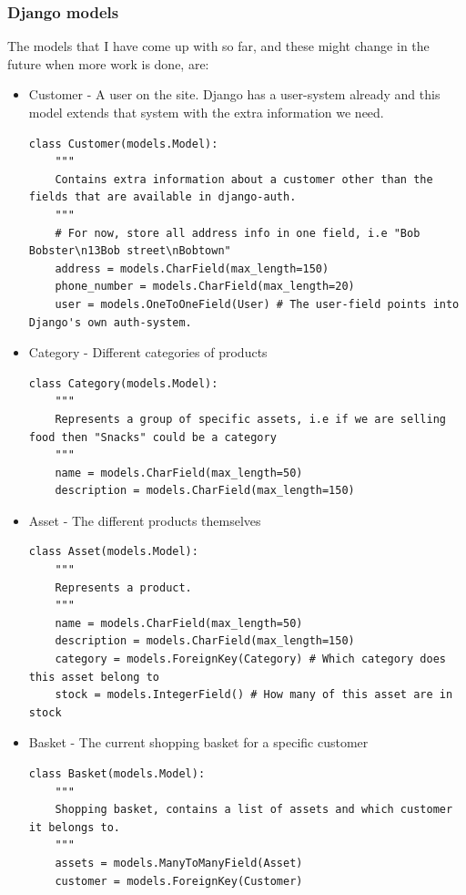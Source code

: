 \documentclass[12pt, a4paper,titlepage]{article}
\begin{document}
\subsubsection{Django models}
\label{sec:djangomodels}
The models that I have come up with so far, and these might change in the
future when more work is done, are:

\begin{itemize}
\setlength\itemsep{-1pt}
\item Customer - A user on the site. Django has a user-system already and this
model extends that system with the extra information we need.
\begin{lstlisting}
class Customer(models.Model):
    """ 
    Contains extra information about a customer other than the fields that are available in django-auth.
    """
    # For now, store all address info in one field, i.e "Bob Bobster\n13Bob street\nBobtown"
    address = models.CharField(max_length=150) 
    phone_number = models.CharField(max_length=20)
    user = models.OneToOneField(User) # The user-field points into Django's own auth-system.
\end{lstlisting}

\item Category - Different categories of products
\begin{lstlisting}
class Category(models.Model):
    """ 
    Represents a group of specific assets, i.e if we are selling food then "Snacks" could be a category
    """
    name = models.CharField(max_length=50)
    description = models.CharField(max_length=150)
\end{lstlisting}

\item Asset - The different products themselves
\begin{lstlisting}
class Asset(models.Model):
    """ 
    Represents a product.
    """
    name = models.CharField(max_length=50)
    description = models.CharField(max_length=150)
    category = models.ForeignKey(Category) # Which category does this asset belong to
    stock = models.IntegerField() # How many of this asset are in stock
\end{lstlisting}

\item Basket - The current shopping basket for a specific customer
\begin{lstlisting}
class Basket(models.Model):
    """
    Shopping basket, contains a list of assets and which customer it belongs to.
    """
    assets = models.ManyToManyField(Asset)
    customer = models.ForeignKey(Customer)
\end{lstlisting}


\end{itemize}
\end{document}
